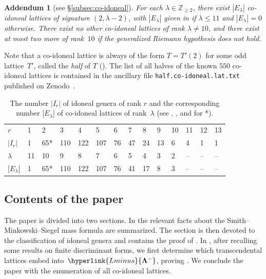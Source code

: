 \documentclass[a4paper]{amsart}
\theoremstyle{definition}
\theoremstyle{plain}
\newtheorem{addendum}[definition]{Addendum}
\newcommand{\IZ}{\mathbb{Z}}
\newcommand{\bLambda}{\mathbf{\Lambda}}
\newcommand{\Lminus}{\hyperlink{Lminus}{\bLambda^-}}
\begin{document}
\begin{addendum}[see §\ref{subsec:co-idoneal}] \label{add:co-idoneal}
For each \(\lambda \in \IZ_{\geq 2}\), there exist \(|E_\lambda|\) co-idoneal lattices of signature \((2, \lambda - 2)\), with \(|E_\lambda|\) given in  if \(\lambda \leq 11\) and \(|E_\lambda| = 0\) otherwise.
There exist no other co-idoneal lattices of rank \(\lambda \neq 10\), and there exist at most two more of rank~\(10\) if the generalized Riemann hypothesis does not hold.
\end{addendum}


Note that a co-idoneal lattice is always of the form \(T = T'(2)\) for some odd lattice~\(T'\), called the \emph{half} of \(T\) ().
The list of all halves of the known \(550\) co-idoneal lattices is contained in the ancillary file \verb+half.co-idoneal.lat.txt+ published on Zenodo~\cite{brandhorst_2024_10617125}.


\begin{table}
\caption{The number \(|I_r|\) of idoneal genera of rank \(r\) and the corresponding number \(|E_\lambda|\) of co-idoneal lattices of rank~\(\lambda\) (see , , and  for *).}
\label{tab:summary}
\begin{tabular}{llllllllllllll}
\toprule
 \(r\) & 1 & 2 & 3 & 4 & 5 & 6 & 7 & 8 & 9 & 10 & 11 & 12 & 13 \\
 \(|I_r|\) & 1 & 65* & 110 & 122 & 107 & 76 & 47 & 24 & 13 & 6 & 4 & 1 & 1 \\
\midrule
 \(\lambda\) & 11 & 10 & 9 & 8 & 7 & 6 & 5 & 4 & 3 & 2 & -- & -- & -- \\
 \(|E_\lambda|\) & 1 & 65* & 110 & 122 & 107 & 76 & 41 & 17 & 8 & 3 & -- & -- & -- \\
\bottomrule
\end{tabular}
\end{table}




\subsection{Contents of the paper}
The paper is divided into two sections.
In  the relevant facts about the Smith--Minkowski--Siegel mass formula are summarized. The section is then devoted to the classification of idoneal genera and contains the proof of . 
In , after recalling some results on finite discriminant forms, we first determine which transcendental lattices embed into~\(\Lminus\), proving .
We conclude the paper with the enumeration of all co-idoneal lattices.
\end{document}
